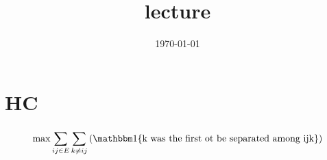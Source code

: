 \documentclass{article}
\title{lecture}
\date{\today}
\theoremstyle{definition}
\begin{document}
\maketitle


\section{HC}
\begin{equation}
    \max \sum_{ij\in E}^{}\sum_{k\neq ij}^{}\left( \mathbbm 1\{\text{k was the first ot be separated among ijk}\} \right)
\end{equation}
\end{document}
